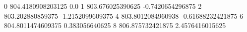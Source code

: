 0 804.4180908203125 0.0
1 803.676025390625 -0.7420654296875
2 803.202880859375 -1.2152099609375
4 803.8012084960938 -0.61688232421875
6 804.8011474609375 0.383056640625
8 806.875732421875 2.4576416015625
